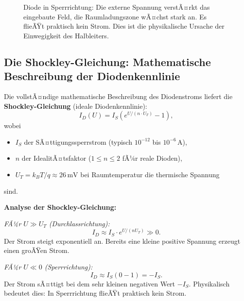 ﻿\documentclass[12pt, a4paper]{article}
\begin{document}
\begin{figure}[h]
		\caption{Diode in Sperrrichtung: Die externe Spannung verstÃ¤rkt das eingebaute
			Feld, die Raumladungszone wÃ¤chst stark an. Es flieÃŸt praktisch kein Strom.
			Dies ist die physikalische Ursache der Einwegigkeit des Halbleiters.}
		\label{fig:diode_reverse}
	\end{figure}
	
	\subsection{Die Shockley-Gleichung: Mathematische Beschreibung der Diodenkennlinie}
	
	Die vollstÃ¤ndige mathematische Beschreibung des Diodenstroms liefert die
	\textbf{Shockley-Gleichung} (ideale Diodenkennlinie):
	\begin{equation}
		I_D(U) = I_S \left( e^{U / (n \cdot U_T)} - 1 \right),
		\label{eq:shockley}
	\end{equation}
	wobei
	\begin{itemize}
		\item $I_S$ der SÃ¤ttigungssperrstrom (typisch $10^{-12}$ bis $10^{-6}\,\mathrm{A}$),
		\item $n$ der IdealitÃ¤tsfaktor ($1 \leq n \leq 2$ fÃ¼r reale Dioden),
		\item $U_T = k_B T / q \approx 26\,\mathrm{mV}$ bei Raumtemperatur die thermische Spannung
	\end{itemize}
	sind.
	
	\textbf{Analyse der Shockley-Gleichung:}
	
	\textit{FÃ¼r $U \gg U_T$ (Durchlassrichtung):}
	\begin{equation}
		I_D \approx I_S \cdot e^{U/(nU_T)} \gg 0.
	\end{equation}
	Der Strom steigt exponentiell an. Bereits eine kleine positive Spannung
	erzeugt einen groÃŸen Strom.
	
	\textit{FÃ¼r $U \ll 0$ (Sperrrichtung):}
	\begin{equation}
		I_D \approx I_S \left(0 - 1\right) = -I_S.
	\end{equation}
	Der Strom sÃ¤ttigt bei dem sehr kleinen negativen Wert $-I_S$. Physikalisch
	bedeutet dies: In Sperrrichtung flieÃŸt praktisch kein Strom.
	
\end{document}
